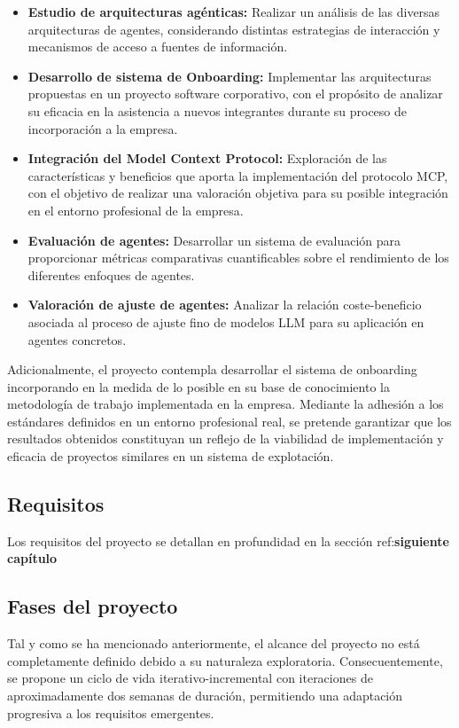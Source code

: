 \begin{itemize}
  \item\textbf{Estudio de arquitecturas agénticas: }Realizar un análisis de las diversas arquitecturas de agentes, considerando distintas estrategias de interacción y mecanismos de acceso a fuentes de información.
  \item\textbf{Desarrollo de sistema de Onboarding: }Implementar las arquitecturas propuestas en un proyecto software corporativo, con el propósito de analizar su eficacia en la asistencia a nuevos integrantes durante su proceso de incorporación a la empresa.
  \item\textbf{Integración del Model Context Protocol: }Exploración de las características y beneficios que aporta la implementación del protocolo MCP, con el objetivo de realizar una valoración objetiva para su posible integración en el entorno profesional de la empresa.
  \item\textbf{Evaluación de agentes: }Desarrollar un sistema de evaluación para proporcionar métricas comparativas cuantificables sobre el rendimiento de los diferentes enfoques de agentes. 
  \item\textbf{Valoración de ajuste de agentes: }Analizar la relación coste-beneficio asociada al proceso de ajuste fino de modelos LLM para su aplicación en agentes concretos.
\end{itemize}

Adicionalmente, el proyecto contempla desarrollar el sistema de onboarding incorporando en la medida de lo posible en su base de conocimiento la metodología de trabajo implementada en la empresa. Mediante la adhesión a los estándares definidos en un entorno profesional real, se pretende garantizar que los resultados obtenidos constituyan un reflejo de la viabilidad de implementación y eficacia de proyectos similares en un sistema de explotación. 

\subsection{Requisitos}
Los requisitos del proyecto se detallan en profundidad en la sección ref:\textbf{siguiente capítulo}

\subsection{Fases del proyecto}
Tal y como se ha mencionado anteriormente, el alcance del proyecto no está completamente definido debido a su naturaleza exploratoria. Consecuentemente, se propone un ciclo de vida iterativo-incremental con iteraciones de aproximadamente dos semanas de duración, permitiendo una adaptación progresiva a los requisitos emergentes.

